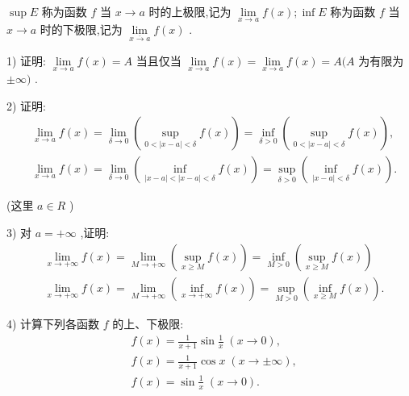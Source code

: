 $\sup E$ 称为函数 $f$ 当 $x \rightarrow  a$ 时的上极限,记为 $\mathop{\lim }\limits_{{x \rightarrow  a}}f\left( x\right) ;\inf E$ 称为函数 $f$ 当 $x \rightarrow  a$ 时的下极限,记为 $\mathop{\lim }\limits_{\overline{x \rightarrow  a}}f\left( x\right)$ .

1) 证明: $\mathop{\lim }\limits_{{x \rightarrow  a}}f\left( x\right)  = A$ 当且仅当 $\mathop{\lim }\limits_{{x \rightarrow  a}}f\left( x\right)  = \mathop{\lim }\limits_{{x \rightarrow  a}}f\left( x\right)  = A(A$ 为有限为 $\pm  \infty )$ .

2) 证明:
\begin{align*}
	&\mathop{\lim }\limits_{{x \rightarrow  a}}f\left( x\right)  = \mathop{\lim }\limits_{{\delta  \rightarrow  0}}\left( {\mathop{\sup }\limits_{{0 < \left| {x - a}\right|  < \delta }}f\left( x\right) }\right)  = \mathop{\inf }\limits_{{\delta  > 0}}\left( {\mathop{\sup }\limits_{{0 < \left| {x - a}\right|  < \delta }}f\left( x\right) }\right) ,\\
	&\mathop{\lim }\limits_{{x \rightarrow  a}}f\left( x\right)  = \mathop{\lim }\limits_{{\delta  \rightarrow  0}}\left( {\mathop{\inf }\limits_{{\left| {x - a}\right|  < \left| {x - a}\right|  < \delta }}f\left( x\right) }\right)  = \mathop{\sup }\limits_{{\delta  > 0}}\left( {\mathop{\inf }\limits_{{\left| {x - a}\right|  < \delta }}f\left( x\right) }\right) .
\end{align*}

(这里 $a \in  R$ )

3) 对 $a =  + \infty$ ,证明:
\begin{align*}
	&\mathop{\lim }\limits_{{x \rightarrow   + \infty }}f\left( x\right)  = \mathop{\lim }\limits_{{M \rightarrow   + \infty }}\left( {\mathop{\sup }\limits_{{x \geq  M}}f\left( x\right) }\right)  = \mathop{\inf }\limits_{{M > 0}}\left( {\mathop{\sup }\limits_{{x \geq  M}}f\left( x\right) }\right)\\
	&\mathop{\lim }\limits_{{x \rightarrow   + \infty }}f\left( x\right)  = \mathop{\lim }\limits_{{M \rightarrow   + \infty }}\left( {\mathop{\inf }\limits_{{x \rightarrow   + \infty }}f\left( x\right) }\right)  = \mathop{\sup }\limits_{{M > 0}}\left( {\mathop{\inf }\limits_{{x \geq  M}}f\left( x\right) }\right) .
\end{align*}

4) 计算下列各函数 $f$ 的上、下极限:
\begin{align*}
	&f\left( x\right)  = \frac{1}{x + 1}\sin \frac{1}{x}\;\left( {x \rightarrow  0}\right) ,\\
	&f\left( x\right)  = \frac{1}{x + 1}\cos x\;\left( {x \rightarrow   \pm  \infty }\right) ,\\
	&f\left( x\right)  = \sin \frac{1}{x}\;\left( {x \rightarrow  0}\right) .
\end{align*}

